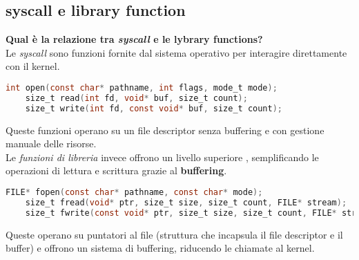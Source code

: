 \subsection{syscall e library function}
\textbf{Qual è la relazione tra \textit{syscall} e le lybrary functions?}\\
Le \textit{syscall} sono funzioni fornite dal sistema operativo per interagire direttamente con il kernel.
\begin{lstlisting}[language=C]
	int open(const char* pathname, int flags, mode_t mode);
	size_t read(int fd, void* buf, size_t count);
	size_t write(int fd, const void* buf, size_t count);
\end{lstlisting}
Queste funzioni operano su un file descriptor senza buffering e con gestione manuale delle risorse.\\
Le \textit{funzioni di libreria} invece offrono un livello superiore , semplificando le operazioni di lettura e scrittura grazie al \textbf{buffering}.
\begin{lstlisting}[language=C]
	FILE* fopen(const char* pathname, const char* mode);
	size_t fread(void* ptr, size_t size, size_t count, FILE* stream);
	size_t fwrite(const void* ptr, size_t size, size_t count, FILE* stream);
\end{lstlisting}
Queste operano su puntatori al file (struttura che incapsula il file descriptor e il buffer) e offrono un sistema di buffering, riducendo le chiamate al kernel.